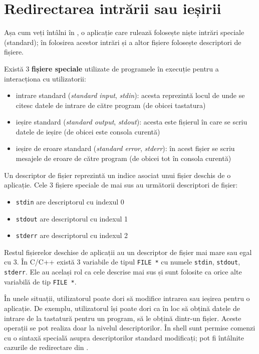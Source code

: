 \section{Redirectarea intrării sau ieșirii}
\label{sec:fs:redirect}

Așa cum veți întâlni în , o aplicație care rulează folosește niște intrări speciale (standard);
în folosirea acestor intrări și a altor fișiere folosește descriptori de fișiere.

Există 3 \textbf{fișiere speciale} utilizate de programele în execuție pentru a interacționa cu utilizatorii:

\begin{itemize}
  \item intrare standard (\textit{standard input}, \textit{stdin}): acesta reprezintă locul de unde se citesc datele de intrare de către program (de obicei tastatura)
  \item ieșire standard (\textit{standard output}, \textit{stdout}): acesta este fișierul în care se scriu datele de ieșire (de obicei este consola curentă)
  \item ieșire de eroare standard (\textit{standard error}, \textit{stderr}): în acest fișier se scriu mesajele de eroare de către program (de obicei tot în consola curentă)
\end{itemize}

Un descriptor de fișier reprezintă un indice asociat unui fișier deschis de o aplicație.
Cele 3 fișiere speciale de mai sus au următorii descriptori de fișier:

\begin{itemize}
  \item \texttt{stdin} are descriptorul cu indexul 0
  \item \texttt{stdout} are descriptorul cu indexul 1
  \item \texttt{stderr} are descriptorul cu indexul 2
\end{itemize}

Restul fișierelor deschise de aplicații au un descriptor de fișier mai mare sau egal cu 3.
În C/C++ există 3 variabile de tipul \texttt{FILE *} cu numele \texttt{stdin}, \texttt{stdout}, \texttt{stderr}.
Ele au același rol ca cele descrise mai sus și sunt folosite ca orice alte variabilă de tip \texttt{FILE *}.

În unele situații, utilizatorul poate dori să modifice intrarea sau ieșirea pentru o aplicație.
De exemplu, utilizatorul își poate dori ca în loc să obțină datele de intrare de la tastatură pentru un program, să le obțină dintr-un fișier.
Aceste operații se pot realiza doar la nivelul descriptorilor.
În shell sunt permise comenzi cu o sintaxă specială asupra descriptorilor standard modificați;
pot fi întâlnite cazurile de redirectare din .

